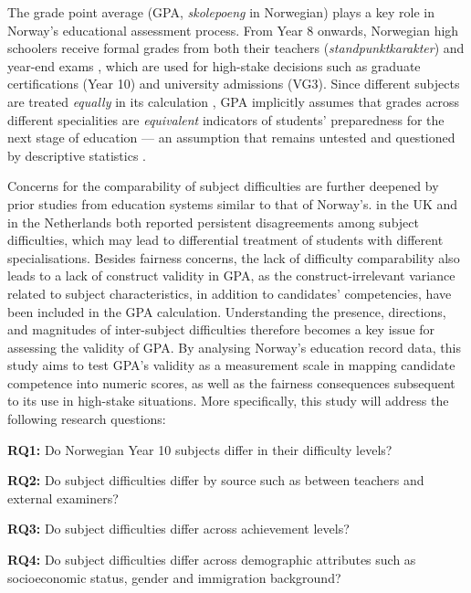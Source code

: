 
The grade point average (GPA, \textit{skolepoeng} in Norwegian) plays a key role in Norway's educational assessment process. From Year 8 onwards, Norwegian high schoolers receive formal grades from both their teachers (\textit{standpunktkarakter}) and year-end exams \parencite{raeder:2020}, which are used for high-stake decisions such as graduate certifications (Year 10) and university admissions (VG3). Since different subjects are treated \emph{equally} in its calculation \parencite{gpa:2021}, GPA implicitly assumes that grades across different specialities are \emph{equivalent} indicators of students' preparedness for the next stage of education --- an assumption that remains untested and questioned by descriptive statistics \parencite{udir:2022}.

Concerns for the comparability of subject difficulties are further deepened by prior studies from education systems similar to that of Norway's. \textcite{he:2018} in the UK and \textcite{korobko:2008} in the Netherlands both reported persistent disagreements among subject difficulties, which may lead to differential treatment of students with different specialisations. Besides fairness concerns, the lack of difficulty comparability also leads to a lack of construct validity \parencite{messick:1989} in GPA, as the construct-irrelevant variance related to subject characteristics, in addition to candidates' competencies, have been included in the GPA calculation. Understanding the presence, directions, and magnitudes of inter-subject difficulties therefore becomes a key issue for assessing the validity of GPA. By analysing Norway's education record data, this study aims to test GPA's validity as a measurement scale in mapping candidate competence into numeric scores, as well as the fairness consequences subsequent to its use in high-stake situations. More specifically, this study will address the following research questions:
\begin{ttitemize}
    \item[\textbf{RQ1:}] Do Norwegian Year 10 subjects differ in their difficulty levels?
    \item[\textbf{RQ2:}] Do subject difficulties differ by source such as between teachers and external examiners?
    \item[\textbf{RQ3:}] Do subject difficulties differ across achievement levels?
    \item[\textbf{RQ4:}] Do subject difficulties differ across demographic attributes such as socioeconomic status, gender and immigration background?
\end{ttitemize}